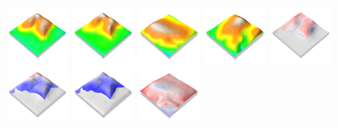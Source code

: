 \documentclass[prodmode,acmtochi]{acmsmall} %
\begin{document}
\begin{figure}[h!]
\begin{center}
		\includegraphics[width=0.18\textwidth]{images/render_3d/mean_dem_2.png}
		\includegraphics[width=0.18\textwidth]{images/render_3d/mean_dem_3.png}
		\includegraphics[width=0.18\textwidth]{images/render_3d/mean_dem_4.png}
		\includegraphics[width=0.18\textwidth]{images/render_3d/mean_dem_5.png}
		\includegraphics[width=0.18\textwidth]{images/render_3d/mean_dem_difference_1.png}
		\includegraphics[width=0.18\textwidth]{images/render_3d/mean_dem_difference_2.png}
		\includegraphics[width=0.18\textwidth]{images/render_3d/mean_dem_difference_3.png}
		\includegraphics[width=0.18\textwidth]{images/render_3d/mean_dem_difference_4.png}

\end{center}
\end{figure}
\end{document}
